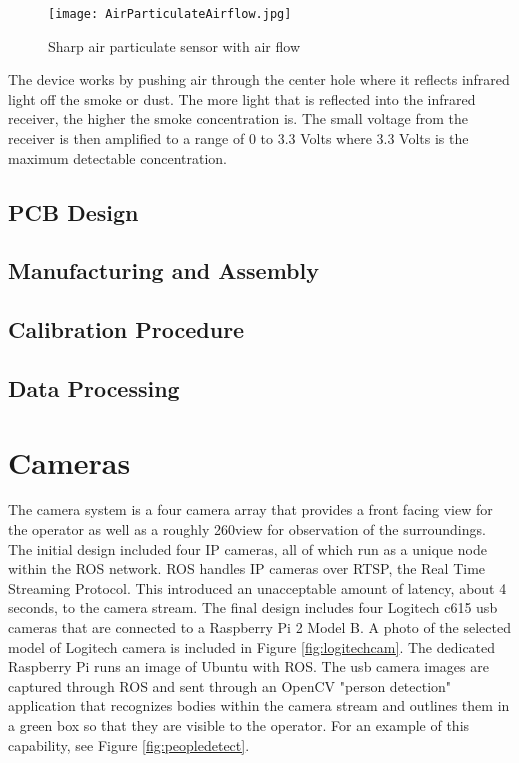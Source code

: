 \begin{figure}[h!]
	\centering
	\texttt{[image: AirParticulateAirflow.jpg]}
	\caption{Sharp air particulate sensor with air flow}
	\label{fig:SmokeDetector}
\end{figure}

The device works by pushing air through the center hole where it reflects infrared light off the smoke or dust. The more light that is reflected into the infrared receiver, the higher the smoke concentration is. The small voltage from the receiver is then amplified to a range of 0 to 3.3 Volts where 3.3 Volts is the maximum detectable concentration.



\subsection{PCB Design}

\subsection{Manufacturing and Assembly}

\subsection{Calibration Procedure}

\subsection{Data Processing}

\section{Cameras}

The camera system is a four camera array that provides a front facing view for the operator as well as a roughly 260\degree  view for observation of the surroundings. The initial design included four IP cameras, all of which run as a unique node within the ROS network. ROS handles IP cameras over RTSP, the Real Time Streaming Protocol. This introduced an unacceptable amount of latency, about 4 seconds, to the camera stream. The final design includes four Logitech c615 usb cameras that are connected to a Raspberry Pi 2 Model B. A photo of the selected model of Logitech camera is included in Figure \ref{fig:logitechcam}. The dedicated Raspberry Pi runs an image of Ubuntu with ROS. The usb camera images are captured through ROS and sent through an OpenCV "person detection" application that recognizes bodies within the camera stream and outlines them in a green box so that they are visible to the operator. For an example of this capability, see Figure \ref{fig:peopledetect}. 

